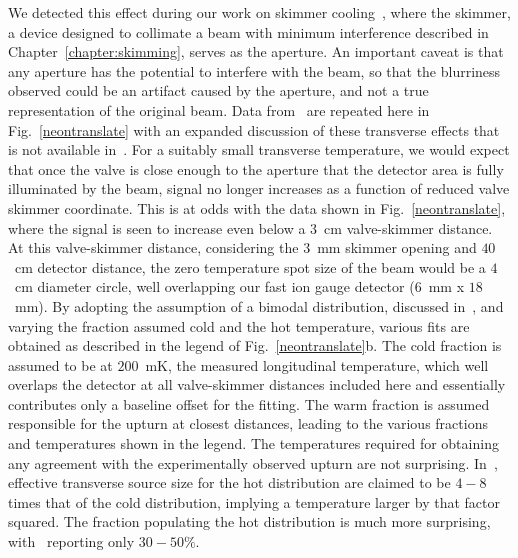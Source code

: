 We detected this effect during our work on skimmer cooling~\cite{Wu2018}, where the skimmer, a device designed to collimate a beam with minimum interference described in Chapter~\ref{chapter:skimming}, serves as the aperture. 
An important caveat is that any aperture has the potential to interfere with the beam, so that the blurriness observed could be an artifact caused by the aperture, and not a true representation of the original beam.
Data from~\citep[Fig.~2c]{Wu2018} are repeated here in Fig.~\ref{neontranslate} with an expanded discussion of these transverse effects that is not available in~\cite{Wu2018}.
For a suitably small transverse temperature, we would expect that once the valve is close enough to the aperture that the detector area is fully illuminated by the beam, signal no longer increases as a function of reduced valve skimmer coordinate.
This is at odds with the data shown in Fig.~\ref{neontranslate}, where the signal is seen to increase even below a $3$~cm valve-skimmer distance.
At this valve-skimmer distance, considering the $3$~mm skimmer opening and $40$~cm detector distance, the zero temperature spot size of the beam would be a $4$~cm diameter circle, well overlapping our fast ion gauge detector ($6$~mm x $18$~mm).
By adopting the assumption of a bimodal distribution, discussed in~\cite{beijerinck1981,Miller1988}, and varying the fraction assumed cold and the hot temperature, various fits are obtained as described in the legend of Fig.~\ref{neontranslate}b.
The cold fraction is assumed to be at $200$~mK, the measured longitudinal temperature, which well overlaps the detector at all valve-skimmer distances included here and essentially contributes only a baseline offset for the fitting.
The warm fraction is assumed responsible for the upturn at closest distances, leading to the various fractions and temperatures shown in the legend.
The temperatures required for obtaining any agreement with the experimentally observed upturn are not surprising.
In~\citep[Abstract, 3rd Paragraph]{beijerinck1981}, effective transverse source size for the hot distribution are claimed to be $4-8$ times that of the cold distribution, implying a temperature larger by that factor squared.
The fraction populating the hot distribution is much more surprising, with~\cite{beijerinck1981} reporting only $30-50\%$.

